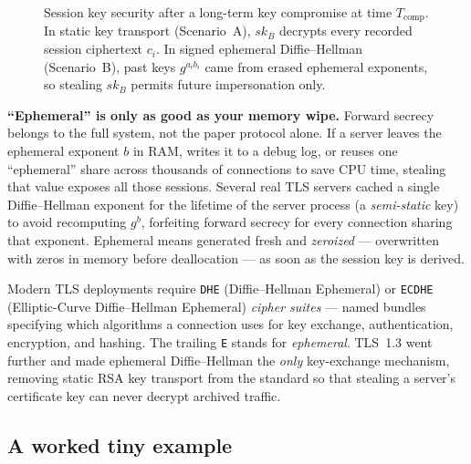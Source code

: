 \begin{figure}[htbp]
\caption{Session key security after a long-term key compromise at time $T_{\mathrm{comp}}$. In static key transport (Scenario~A), $sk_B$ decrypts every recorded session ciphertext $c_i$. In signed ephemeral Diffie--Hellman (Scenario~B), past keys $g^{a_i b_i}$ came from erased ephemeral exponents, so stealing $sk_B$ permits future impersonation only.}
\label{ch23:fig-pfs-timeline}
\end{figure}

\begin{trapbox}
\textbf{``Ephemeral'' is only as good as your memory wipe.}
Forward secrecy belongs to the full system, not the paper protocol alone. If a
server leaves the ephemeral exponent $b$ in RAM, writes it to a debug log, or
reuses one ``ephemeral'' share across thousands of connections to save CPU time,
stealing that value exposes all those sessions. Several real TLS servers cached
a single Diffie--Hellman exponent for the lifetime of the server process (a
\emph{semi-static} key) to avoid recomputing $g^b$, forfeiting forward secrecy
for every connection sharing that exponent. Ephemeral means generated fresh and
\emph{zeroized} --- overwritten with zeros in memory before deallocation --- as
soon as the session key is derived.
\end{trapbox}

\begin{applicationbox}
Modern TLS deployments require \texttt{DHE} (Diffie--Hellman Ephemeral) or
\texttt{ECDHE} (Elliptic-Curve Diffie--Hellman Ephemeral) \emph{cipher suites}
--- named bundles specifying which algorithms a connection uses for key
exchange, authentication, encryption, and hashing. The trailing \texttt{E}
stands for \emph{ephemeral}. TLS~1.3 went further and made ephemeral
Diffie--Hellman the \emph{only} key-exchange mechanism, removing static RSA key
transport from the standard so that stealing a server's certificate key can
never decrypt archived traffic.
\end{applicationbox}

\subsection{A worked tiny example}

